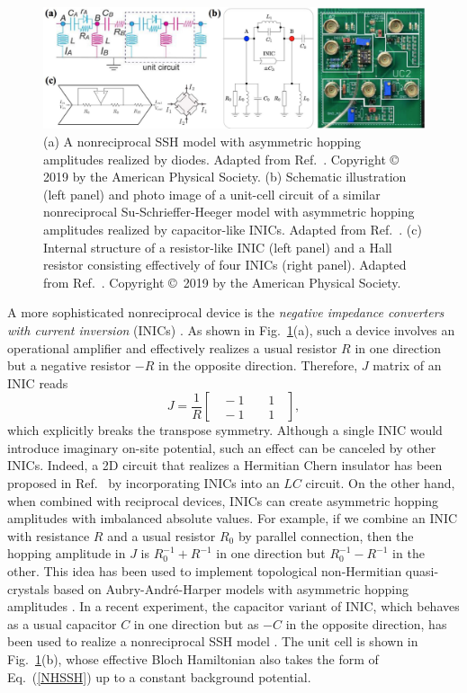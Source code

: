 \documentclass{tADP2e}
\theoremstyle{plain}
\theoremstyle{plain}
\theoremstyle{definition}
\begin{document}
\begin{figure}
\begin{center}
\includegraphics[width=12cm]{./Figures/fig_3_nrcircuit.pdf}
\end{center}
\caption{(a) A nonreciprocal SSH model with asymmetric hopping amplitudes realized by diodes. Adapted from Ref.~\cite{EM19b}. Copyright \copyright\,   2019 by the American Physical Society. (b) Schematic illustration (left panel) and photo image of a unit-cell circuit of a similar nonreciprocal Su-Schrieffer-Heeger model with asymmetric hopping amplitudes realized by capacitor-like INICs. Adapted from Ref.~\cite{TH19}. (c) Internal structure of a resistor-like INIC (left panel) and a Hall resistor consisting effectively of four INICs (right panel). Adapted from Ref.~\cite{HR19}. Copyright \copyright\,   2019 by the American Physical Society.}
\label{fig:3nrcircuit}
\end{figure}


A more sophisticated nonreciprocal device is the \emph{negative impedance converters with current inversion} (INICs) \cite{WKC09}. As shown in Fig.~\ref{fig:3nrcircuit}(a), such a device involves an operational amplifier and effectively realizes a usual resistor $R$ in one direction but a negative resistor $-R$ in the opposite direction.  
Therefore, $J$ matrix of an INIC reads
\begin{equation}
J=\frac{1}{R}
\begin{bmatrix} 
\;\;-1\;\; & \;\;1\;\; \\ 
\;\;-1\;\; & \;\;1\;\;
\end{bmatrix},
\end{equation}
which explicitly breaks the transpose symmetry. Although a single INIC would introduce imaginary on-site potential, such an effect can be canceled by other INICs. Indeed, a 2D circuit that realizes a Hermitian Chern insulator has been proposed in Ref.~\cite{HT19} by incorporating INICs into an $LC$ circuit. On the other hand, when combined with reciprocal devices, INICs can create asymmetric hopping amplitudes with imbalanced absolute values. For example, if we combine an INIC with resistance $R$ and a usual resistor $R_0$ by parallel connection, then the hopping amplitude in $J$ is $R_0^{-1}+R^{-1}$ in one direction but $R_0^{-1}-R^{-1}$ in the other. This idea has been used to implement topological non-Hermitian quasi-crystals based on Aubry-Andr\'e-Harper models with asymmetric hopping amplitudes \cite{ZQB20}. In a recent experiment, the capacitor variant of INIC, which behaves as a usual capacitor $C$ in one direction but as $-C$ in the opposite direction, has been used to realize a nonreciprocal SSH model \cite{TH19}. The unit cell is shown in Fig.~\ref{fig:3nrcircuit}(b), whose  effective Bloch Hamiltonian also takes the form of Eq.~(\ref{NHSSH}) up to a constant background potential.
\end{document}
